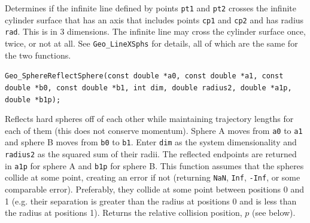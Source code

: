 \documentclass[11pt]{article}
\newcommand {\ttt} {\texttt}
\begin{document}
\begin{description}
Determines if the infinite line defined by points \ttt{pt1} and \ttt{pt2} crosses the infinite cylinder surface that has an axis that includes points \ttt{cp1} and \ttt{cp2} and has radius \ttt{rad}. This is in 3 dimensions. The infinite line may cross the cylinder surface once, twice, or not at all. See \ttt{Geo\_LineXSphs} for details, all of which are the same for the two functions.

\item[\underline{Reflect function}]

\item[\ttt{double}]
\ttt{Geo\_SphereReflectSphere(const double *a0, const double *a1, const double *b0, const double *b1, int dim, double radius2, double *a1p, double *b1p);}

Reflects hard spheres off of each other while maintaining trajectory lengths for each of them (this does not conserve momentum). Sphere A moves from \ttt{a0} to \ttt{a1} and sphere B moves from \ttt{b0} to \ttt{b1}. Enter \ttt{dim} as the system dimensionality and \ttt{radius2} as the squared sum of their radii. The reflected endpoints are returned in \ttt{a1p} for sphere A and \ttt{b1p} for sphere B. This function assumes that the spheres collide at some point, creating an error if not (returning \ttt{NaN}, \ttt{Inf}, \ttt{-Inf}, or some comparable error). Preferably, they collide at some point between positions 0 and 1 (e.g. their separation is greater than the radius at positions 0 and is less than the radius at positions 1). Returns the relative collision position, $p$ (see below).


\end{description}
\end{document}
